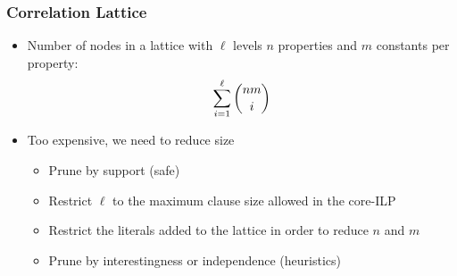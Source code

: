 \documentclass{beamer}
\begin{document}
\begin{frame}
\frametitle{Correlation Lattice}
  \begin{itemize}
     \item Number of nodes in a lattice with $\ell$ levels $n$ properties and $m$ constants per property:
      \begin{equation}
	\sum_{i=1}^{\ell} \dbinom{nm}{i}
      \end{equation}
      \item Too expensive, we need to reduce size 
      \begin{itemize}
	\item Prune by support (safe)
	\item Restrict $\ell$ to the maximum clause size allowed in the core-ILP
	\item Restrict the literals added to the lattice in order to reduce $n$ and $m$
	\item Prune by interestingness or independence (heuristics)
      \end{itemize}
  \end{itemize}
\end{frame}
\end{document}
